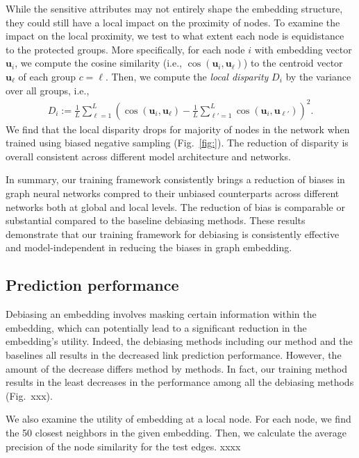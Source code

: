 \documentclass{article}
\theoremstyle{plain}
\theoremstyle{definition}
\theoremstyle{remark}
\def\vec#1{{\bm #1}}
\def\vec#1{{\bm #1}}
\begin{document}
While the sensitive attributes may not entirely shape the embedding structure, they could still have a local impact on the proximity of nodes. 
To examine the impact on the local proximity, we test to what extent each node is equidistance to the protected groups. More specifically, for each node $i$ with embedding vector $\vec{u}_{i}$, we compute the cosine similarity (i.e., $\cos(\vec{u}_i, \vec{u}_\ell)$) to the centroid vector $\vec{u}_\ell$ of each group $c=\ell$. Then, we compute the \textit{local disparity} $D_i$ by the variance over all groups, i.e., 
\begin{align}
D_i:= \frac{1}{L}\sum_{\ell=1}^L \left(\cos(\vec{u}_i, \vec{u}_\ell) - \frac{1}{L}\sum_{\ell'=1}^L \cos(\vec{u}_i, \vec{u}_{\ell'})\right)^2.
\end{align}
We find that the local disparity drops for majority of nodes in the network when trained using biased negative sampling (Fig.~\ref{fig:}). The reduction of disparity is overall consistent across different model architecture and networks.  

In summary, our training framework consistently brings a reduction of biases in graph neural networks compred to their unbiased counterparts across different networks both at global and local levels. The reduction of bias is comparable or substantial compared to the baseline debiasing methods. These results demonstrate that our training framework for debiasing is consistently effective and model-independent in reducing the biases in graph embedding.  

\subsection{Prediction performance}

Debiasing an embedding involves masking certain information within the embedding, which can potentially lead to a significant reduction in the embedding's utility.
Indeed, the debiasing methods including our method and the baselines all results in the decreased link prediction performance. However, the amount of the decrease differs method by methods. In fact, our training method results in the least decreases in the performance among all the debiasing methods (Fig.~xxx). 

We also examine the utility of embedding at a local node. 
For each node, we find the 50 closest neighbors in the given embedding. Then, we calculate the average precision of the node similarity for the test edges. 
xxxx
\end{document}
